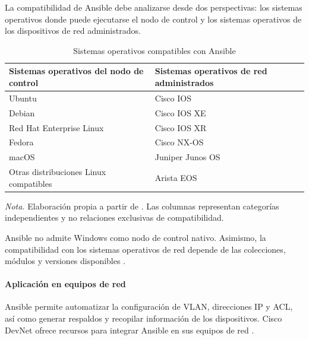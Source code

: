 \documentclass[12pt,a4paper]{article}
\begin{document}
La compatibilidad de Ansible debe analizarse desde dos
perspectivas: los sistemas operativos donde puede ejecutarse
el nodo de control y los sistemas operativos de los dispositivos
de red administrados.

\begin{table}[H]
    \centering
    \caption{Sistemas operativos compatibles con Ansible}
    \label{tab:so_ansible}

    \begin{tabularx}{\textwidth}{XX}
        \toprule

        \textbf{Sistemas operativos del nodo de control} &
        \textbf{Sistemas operativos de red administrados} \\

        \midrule

        Ubuntu & Cisco IOS \\
        Debian & Cisco IOS XE \\
        Red Hat Enterprise Linux & Cisco IOS XR \\
        Fedora & Cisco NX-OS \\
        macOS & Juniper Junos OS \\
        Otras distribuciones Linux compatibles & Arista EOS \\

        \bottomrule
    \end{tabularx}

    \vspace{0.2cm}

    {\footnotesize
    \textit{Nota.} Elaboración propia a partir de
    \parencite{redhat_ansible_network,redhat_ansible_install}.
    Las columnas representan categorías independientes y no
    relaciones exclusivas de compatibilidad.}
\end{table}

Ansible no admite Windows como nodo de control nativo.
Asimismo, la compatibilidad con los sistemas operativos de
red depende de las colecciones, módulos y versiones disponibles
\parencite{redhat_ansible_install,redhat_ansible_network}.


\paragraph{Aplicación en equipos de red}

Ansible permite automatizar la configuración de VLAN, direcciones IP y ACL, así como generar respaldos y recopilar información de los dispositivos. Cisco DevNet ofrece recursos para integrar Ansible en sus equipos de red \parencite{cisco_ansible}.
\end{document}
